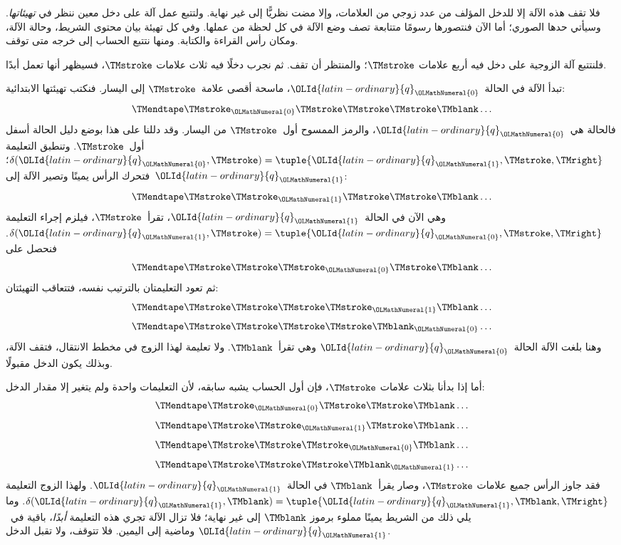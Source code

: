\documentclass[../../../include/open-logic-section]{subfiles}
\begin{document}
\begin{explain}
فلا تقف هذه الآلة إلا للدخل المؤلف من عدد زوجي من العلامات، وإلا مضت نظريًّا إلى غير نهاية. ولتتبع عمل آلة على دخل معين ننظر في \emph{تهيئاتها}. وسيأتي حدها الصوري؛ أما الآن فنتصورها رسومًا متتابعة تصف وضع الآلة في كل لحظة من عملها. وفي كل تهيئة بيان محتوى الشريط، وحالة الآلة، ومكان رأس القراءة والكتابة. ومنها نتتبع الحساب إلى خرجه متى توقف.

فلنتتبع آلة الزوجية على دخل فيه أربع علامات $\TMstroke$؛ والمنتظر أن تقف. ثم نجرب دخلًا فيه ثلاث علامات $\TMstroke$، فسيظهر أنها تعمل أبدًا.

تبدأ الآلة في الحالة~${\OLId{latin-ordinary}{q}}_{\OLMathNumeral{0}}$، ماسحة أقصى علامة~$\TMstroke$ إلى اليسار. فنكتب تهيئتها الابتدائية:
\[
\TMendtape \TMstroke_{\OLMathNumeral{0}} \TMstroke \TMstroke \TMstroke \TMblank \ldots
\]
فالحالة هي~${\OLId{latin-ordinary}{q}}_{\OLMathNumeral{0}}$، والرمز الممسوح أول~$\TMstroke$ من اليسار. وقد دللنا على هذا بوضع دليل الحالة أسفل أول~$\TMstroke$. وتنطبق التعليمة $\delta({\OLId{latin-ordinary}{q}}_{\OLMathNumeral{0}},\TMstroke)=\tuple{{\OLId{latin-ordinary}{q}}_{\OLMathNumeral{1}},\TMstroke,\TMright}$؛ فتحرك الرأس يمينًا وتصير الآلة إلى~${\OLId{latin-ordinary}{q}}_{\OLMathNumeral{1}}$:
\[
\TMendtape \TMstroke \TMstroke_{\OLMathNumeral{1}} \TMstroke \TMstroke \TMblank \ldots
\]
وهي الآن في الحالة~${\OLId{latin-ordinary}{q}}_{\OLMathNumeral{1}}$، تقرأ~$\TMstroke$، فيلزم إجراء التعليمة $\delta({\OLId{latin-ordinary}{q}}_{\OLMathNumeral{1}},\TMstroke)=\tuple{{\OLId{latin-ordinary}{q}}_{\OLMathNumeral{0}},
  \TMstroke,\TMright}$. فنحصل على
\[
\TMendtape \TMstroke \TMstroke \TMstroke_{\OLMathNumeral{0}} \TMstroke \TMblank \ldots
\]
ثم تعود التعليمتان بالترتيب نفسه، فتتعاقب التهيئتان:
\[
\TMendtape \TMstroke \TMstroke \TMstroke \TMstroke_{\OLMathNumeral{1}} \TMblank \ldots
\]
\[
\TMendtape \TMstroke \TMstroke \TMstroke \TMstroke \TMblank_{\OLMathNumeral{0}} \ldots
\]
وهنا بلغت الآلة الحالة~${\OLId{latin-ordinary}{q}}_{\OLMathNumeral{0}}$ وهي تقرأ~$\TMblank$. ولا تعليمة لهذا الزوج في مخطط الانتقال، فتقف الآلة، وبذلك يكون الدخل مقبولًا.

أما إذا بدأنا بثلاث علامات $\TMstroke$، فإن أول الحساب يشبه سابقه، لأن التعليمات واحدة ولم يتغير إلا مقدار الدخل:
\[
\TMendtape \TMstroke_{\OLMathNumeral{0}} \TMstroke \TMstroke \TMblank \ldots
\]
\[
\TMendtape \TMstroke \TMstroke_{\OLMathNumeral{1}} \TMstroke \TMblank \ldots
\]
\[
\TMendtape \TMstroke \TMstroke \TMstroke_{\OLMathNumeral{0}} \TMblank \ldots
\]
\[
\TMendtape \TMstroke \TMstroke \TMstroke \TMblank_{\OLMathNumeral{1}} \ldots
\]
فقد جاوز الرأس جميع علامات $\TMstroke$، وصار يقرأ~$\TMblank$ في الحالة~${\OLId{latin-ordinary}{q}}_{\OLMathNumeral{1}}$. ولهذا الزوج التعليمة $\delta({\OLId{latin-ordinary}{q}}_{\OLMathNumeral{1}},\TMblank)=\tuple{{\OLId{latin-ordinary}{q}}_{\OLMathNumeral{1}},\TMblank,\TMright}$. وما يلي ذلك من الشريط يمينًا مملوء برموز $\TMblank$ إلى غير نهاية؛ فلا تزال الآلة تجري هذه التعليمة \emph{أبدًا}، باقية في~${\OLId{latin-ordinary}{q}}_{\OLMathNumeral{1}}$ وماضية إلى اليمين. فلا تتوقف، ولا تقبل الدخل.
\end{explain}
\end{document}
